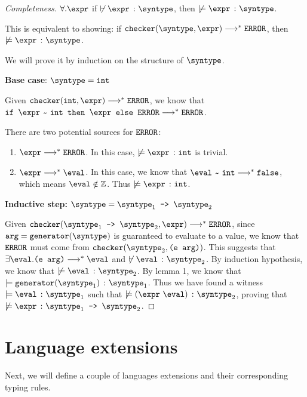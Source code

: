 \begin{proof}[Completeness]
  $\forall. \expr$ if $\not\vdash \hastype{\expr}{\syntype}$, then $\not\models \hastype{\expr}{\syntype}$.

  This is equivalent to showing: if $\mkche{\syntype}{\expr} \smallsteps[] \eerror$, then $\not\models \hastype{\expr}{\syntype}$.

  We will prove it by induction on the structure of $\syntype$.

  \textbf{Base case}: $\syntype = \tint$

  Given $\mkche{\tint}{\expr} \smallsteps[] \eerror$, we know that $\ife{\matches{\expr}{\tint}}{\expr}{\eerror} \smallsteps[] \eerror$. 
  
  There are two potential sources for $\texttt{ERROR}$:
  \begin{enumerate}
    \item $\expr \smallsteps[] \eerror$. In this case, $\not\models \hastype{\expr}{\tint}$ is trivial. 
    \item $\expr \smallsteps[] \eval$. In this case, we know that $\matches{\eval}{\tint} \smallsteps[] \texttt{false}$, which means $\eval \notin \mathbb{Z}$. Thus $\not\models \hastype{\expr}{\tint}$. 
  \end{enumerate}

  \textbf{Inductive step:} $\syntype = \mkfun{\syntype_1}{\syntype_2}$

  Given $\mkche{\mkfun{\syntype_1}{\syntype_2}}{\expr} \smallsteps[] \eerror$, since $\texttt{arg} = \mkgen{\syntype}$ is guaranteed to evaluate to a value, we know that $\texttt{ERROR}$ must come from $\mkche{\syntype_2}{\texttt{(e arg)}}$. This suggests that $\exists \eval. \texttt{(e arg)} \smallsteps[] \eval$ and $\not\vdash \hastype{\eval}{\syntype_2}$. By induction hypothesis, we know that $\not\models \hastype{\texttt{\eval}}{\syntype_2}$. By lemma 1, we know that $\models \hastype{\mkgen{\syntype_1}}{\syntype_1}$. Thus we have found a witness $\models \hastype{\eval}{\syntype_1}$ such that $\not\models \hastype{(\expr \ \eval)}{\syntype_2}$, proving that $\not\models \hastype{\expr}{\mkfun{\syntype_1}{\syntype_2}}$.


\end{proof}

\section{Language extensions}

Next, we will define a couple of languages extensions and their corresponding typing rules.

